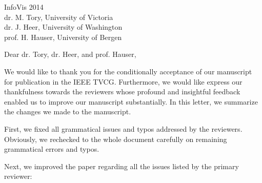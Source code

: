 \documentclass{letter}
\begin{document}
\begin{letter}{InfoVis 2014 \\ dr. M. Tory, University of Victoria \\ dr. J. Heer, University of Washington \\ prof. H. Hauser, University of Bergen}
\opening{Dear dr. Tory, dr. Heer, and prof. Hauser,}

We would like to thank you for the conditionally acceptance of our manuscript for publication in the IEEE TVCG. Furthermore, we would like express our thankfulness towards the reviewers whose profound and insightful feedback enabled us to improve our manuscript substantially. In this letter, we summarize the changes we made to the manuscript.


First, we fixed all grammatical issues and typos addressed by the reviewers. Obviously, we rechecked to the whole document carefully on remaining grammatical errors and typos.

Next, we improved the paper regarding all the issues listed by the primary reviewer:


\end{letter}
\end{document}
